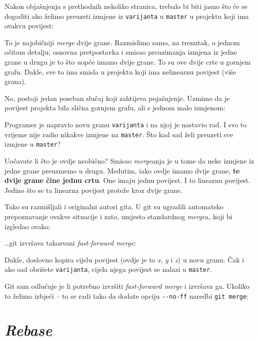 Nakon objašnjenja s prethodnih nekoliko stranica, trebalo bi biti jasno što će se dogoditi ako želimo preuzeti izmjene iz \verb+varijanta+ u \verb+master+ u projektu koji ima ovakvu povijest:



To je najobičniji \emph{merge} dvije grane.
Razmislimo samo, na trenutak, o jednom očitom detalju;
osnovna pretpostavka i smisao preuzimanja izmjena iz jedne grane u drugu je to što uopće imamo dvije grane.
To su ove dvije crte u gornjem grafu.
Dakle, sve to ima smisla u projektu koji ima nelinearnu povijest (više grana).

No, postoji jedan poseban slučaj koji zahtijeva pojašnjenje.
Uzmimo da je povijest projekta bila slična gornjem grafu, ali s jednom malo izmjenom:



Programer je napravio novu granu \verb+varijanta+ i na njoj je nastavio rad.
I svo to vrijeme nije radio nikakve izmjene na \verb+master+.
Što kad sad želi preuzeti sve izmjene u \verb+master+?

Uočavate li što je ovdje neobično?
Smisao \emph{merge}anja je u tome da neke izmjene iz jedne grane preuzmemo u drugu.
Međutim, iako ovdje imamo dvije grane, \textbf{te dvije grane čine jednu crtu}. 
One imaju jednu povijest. 
I to linearnu povijest.
Jedino što se ta linearna povijest proteže kroz dvije grane.

Tako su razmišljali i originalni autori gita.
U git su ugradili automatsko prepoznavanje ovakve situacije i zato, umjesto standardnog \emph{merge}a, koji bi izgledao ovako:



\dots{}git izvršava takozvani \emph{fast-forward merge}:



Dakle, doslovno kopira cijelu povijest (ovdje je to \emph x, \emph y i \emph z) u novu granu.
Čak i ako sad obrišete \verb+varijanta+, cijela njega povijest se nalazi u \verb+master+.

Git sam odlučuje je li potrebno izvršiti \emph{fast-forward merge} i izvršava ga. Ukoliko to želimo izbjeći -- to se radi tako da dodate opciju \verb+--no-ff+ naredbi \verb+git merge+:


\section*{\emph{Rebase}}

